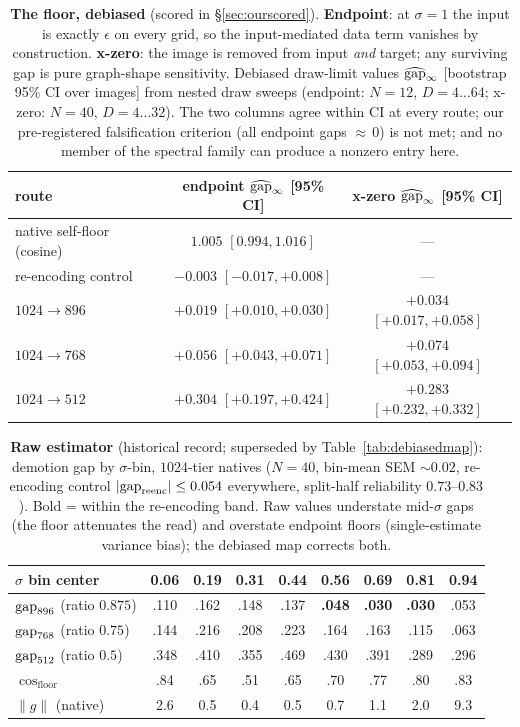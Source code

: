 \begin{table}[h]
\caption{\textbf{The floor, debiased} (scored in
\S\ref{sec:ourscored}). \textbf{Endpoint}: at $\sigma{=}1$ the
input is exactly $\epsilon$ on every grid, so the input-mediated data
term vanishes by construction. \textbf{x-zero}: the image is removed
from input \emph{and} target; any surviving gap is pure graph-shape
sensitivity. Debiased draw-limit values $\widehat{\mathrm{gap}}_\infty$ [bootstrap 95\%
CI over images] from nested draw sweeps (endpoint: $N{=}12$,
$D = 4 \ldots 64$; x-zero: $N{=}40$, $D = 4 \ldots 32$). The two
columns agree within CI at every route; our pre-registered
falsification criterion (all endpoint gaps ${\approx}\,0$) is not met;
and no member of the
spectral family can produce a nonzero entry here.}
\label{tab:floor}
\centering
\small
\begin{tabular}{lcc}
\toprule
route & endpoint $\widehat{\mathrm{gap}}_\infty$ [95\% CI] &
x-zero $\widehat{\mathrm{gap}}_\infty$ [95\% CI] \\
\midrule
native self-floor (cosine) & $1.005$ $[0.994, 1.016]$ & --- \\
re-encoding control & $-0.003$ $[-0.017, +0.008]$ & --- \\
$1024{\to}896$ & $+0.019$ $[+0.010, +0.030]$ & $+0.034$ $[+0.017, +0.058]$ \\
$1024{\to}768$ & $+0.056$ $[+0.043, +0.071]$ & $+0.074$ $[+0.053, +0.094]$ \\
$1024{\to}512$ & $+0.304$ $[+0.197, +0.424]$ & $+0.283$ $[+0.232, +0.332]$ \\
\bottomrule
\end{tabular}
\end{table}

\begin{table}[h]
\caption{\textbf{Raw estimator} (historical record; superseded by
Table~\ref{tab:debiasedmap}): demotion gap by
$\sigma$-bin, $1024$-tier natives ($N{=}40$,
bin-mean SEM ${\sim}0.02$, re-encoding control $|\mathrm{gap}_{\mathrm{reenc}}| \le 0.054$
everywhere, split-half reliability $0.73$--$0.83$). Bold = within the
re-encoding band. Raw values understate mid-$\sigma$ gaps (the floor
attenuates the read) and overstate endpoint floors (single-estimate
variance bias); the debiased map corrects both.}
\label{tab:phase0}
\centering
\small
\begin{tabular}{lcccccccc}
\toprule
$\sigma$ bin center & 0.06 & 0.19 & 0.31 & 0.44 & 0.56 & 0.69 & 0.81 & 0.94 \\
\midrule
$\mathrm{gap}_{896}$ (ratio $0.875$) & .110 & .162 & .148 & .137 & \textbf{.048} & \textbf{.030} & \textbf{.030} & .053 \\
$\mathrm{gap}_{768}$ (ratio $0.75$)  & .144 & .216 & .208 & .223 & .164 & .163 & .115 & .063 \\
$\mathrm{gap}_{512}$ (ratio $0.5$)   & .348 & .410 & .355 & .469 & .430 & .391 & .289 & .296 \\
\midrule
$\cos_{\mathrm{floor}}$ & .84 & .65 & .51 & .65 & .70 & .77 & .80 & .83 \\
$\|g\|$ (native) & 2.6 & 0.5 & 0.4 & 0.5 & 0.7 & 1.1 & 2.0 & 9.3 \\
\bottomrule
\end{tabular}
\end{table}

